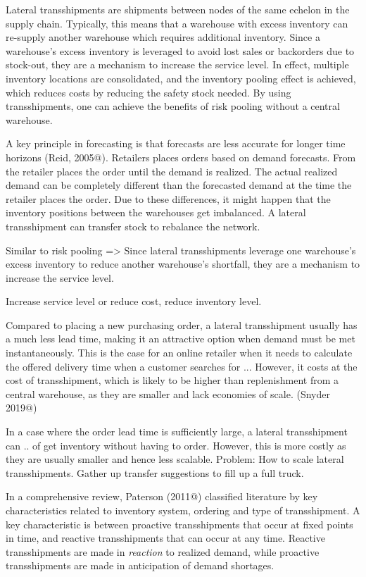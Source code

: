 \documentclass[../../main.tex]{subfiles}
\begin{document}
Lateral transshipments are shipments between nodes of the same echelon in the supply chain. Typically, this means that a warehouse with excess inventory can re-supply another warehouse which requires additional inventory. Since a warehouse's excess inventory is leveraged to avoid lost sales or backorders due to stock-out, they are a mechanism to increase the service level. In effect, multiple inventory locations are consolidated, and the inventory pooling effect is achieved, which reduces costs by reducing the safety stock needed. By using transshipments, one can achieve the benefits of risk pooling without a central warehouse. 

A key principle in forecasting is that forecasts are less accurate for longer time horizons (Reid, 2005@). Retailers places orders based on demand forecasts. From the retailer places the order until the demand is realized. The actual realized demand can be completely different than the forecasted demand at the time the retailer places the order. Due to these differences, it might happen that the inventory positions between the warehouses get imbalanced. A lateral transshipment can transfer stock to rebalance the network. 

Similar to risk pooling => Since lateral transshipments leverage one warehouse's excess inventory to reduce another warehouse's shortfall, they are a mechanism to increase the service level.

Increase service level or reduce cost, reduce inventory level.

Compared to placing a new purchasing order, a lateral transshipment usually has a much less lead time, making it an attractive option when demand must be met instantaneously. This is the case for an online retailer when it needs to calculate the offered delivery time when a customer searches for ... However, it costs at the cost of transshipment, which is likely to be higher than replenishment from a central warehouse, as they are smaller and lack economies of scale. (Snyder 2019@)

In a case where the order lead time is sufficiently large, a lateral transshipment can .. of get inventory without having to order. However, this is more costly as they are usually smaller and hence less scalable. Problem: How to scale lateral transshipments. Gather up transfer suggestions to fill up a full truck.

In a comprehensive review, Paterson (2011@) classified literature by key characteristics related to inventory system, ordering and type of transshipment. A key characteristic is between proactive transshipments that occur at fixed points in time, and reactive transshipments that can occur at any time. Reactive transshipments are made in \textit{reaction} to realized demand, while proactive transshipments are made in anticipation of demand shortages. 
\end{document}
